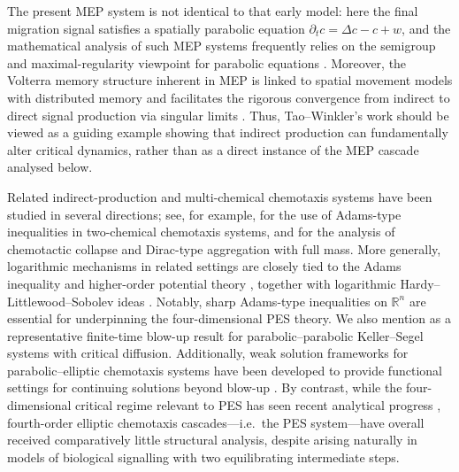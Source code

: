 \documentclass[11pt,reqno]{amsart}
\theoremstyle{definition}
\theoremstyle{remark}
\begin{document}
The present MEP system is not identical to that early model: here the final migration signal satisfies a spatially parabolic equation $\partial_t c=\Delta c-c+w$, and the mathematical analysis of such MEP systems frequently relies on the semigroup and maximal-regularity viewpoint for parabolic equations \cite{pazy2012semigroups,henry2006geometric,lunardi2012analytic,wang2026breakdown,amann1995linear,pruss2016moving}. Moreover, the Volterra memory structure inherent in MEP is linked to spatial movement models with distributed memory \cite{shi2021spatial} and facilitates the rigorous convergence from indirect to direct signal production via singular limits \cite{bui2026parabolic,wang2025multi,liu2025global}. Thus, Tao--Winkler's work should be viewed as a guiding example showing that indirect production can fundamentally alter critical dynamics, rather than as a direct instance of the MEP cascade analysed below.

Related indirect-production and multi-chemical chemotaxis systems have been studied in several directions; see, for example, \cite{fujie2017application} for the use of Adams-type inequalities in two-chemical chemotaxis systems, and \cite{nagai2000chemotactic,gao2022rolling,mao2024dirac} for the analysis of chemotactic collapse and Dirac-type aggregation with full mass. More generally, logarithmic mechanisms in related settings are closely tied to the Adams inequality and higher-order potential theory \cite{adams1988sharp,adams2003sobolev,hebey2000nonlinear,yu2026beyond,lin1998classification,martinazzi2009classification}, together with logarithmic Hardy--Littlewood--Sobolev ideas \cite{carlen1992competing,lieb2001analysis}. Notably, sharp Adams-type inequalities on $\mathbb{R}^n$ \cite{ruf2013sharp} are essential for underpinning the four-dimensional PES theory. We also mention \cite{laurenccot2017finite} as a representative finite-time blow-up result for parabolic--parabolic Keller--Segel systems with critical diffusion. Additionally, weak solution frameworks for parabolic--elliptic chemotaxis systems have been developed to provide functional settings for continuing solutions beyond blow-up \cite{senba2002weak}. By contrast, while the four-dimensional critical regime relevant to PES has seen recent analytical progress \cite{fujie2017application,yu2026rigorous,fujie2019blowup,hosono2025global}, fourth-order elliptic chemotaxis cascades---i.e.\ the PES system---have overall received comparatively little structural analysis, despite arising naturally in models of biological signalling with two equilibrating intermediate steps.
\end{document}
